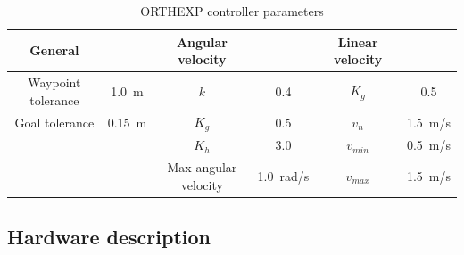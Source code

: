 \begin{table}[htpb]
	\caption{\ac{ORTHEXP} controller parameters} \label{tab:orthexp_params}
	\begin{center}
		\begin{tabular}{c c c c c c} \toprule
			General            &              & Angular velocity     &                 & Linear velocity                 \\
			\midrule
			Waypoint tolerance & \SI{1.0}{m}  & $k$                  & 0.4             & $K_g$           & 0.5           \\
			Goal tolerance     & \SI{0.15}{m} & $K_g$                & 0.5             & $v_n$           & \SI{1.5}{m/s} \\
			                   &              & $K_h$                & 3.0             & $v_{min}$       & \SI{0.5}{m/s} \\
			                   &              & Max angular velocity & \SI{1.0}{rad/s} & $v_{max}$       & \SI{1.5}{m/s} \\
			\bottomrule
		\end{tabular}
	\end{center}
\end{table}

\subsection{Hardware description}
\label{sec:hardware}

